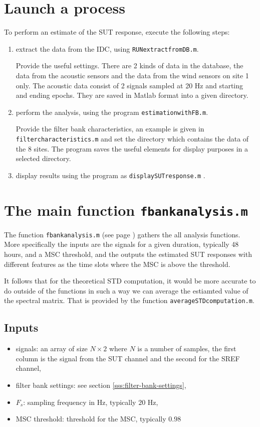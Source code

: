 

\section{Launch a process}
To perform an estimate of the SUT response, execute the following steps:
\begin{enumerate}
\item
extract the data from the IDC, using {\tt RUNextractfromDB.m}. 
 
Provide the useful settings. There are 2 kinds of data in the database, the data from the acoustic sensors and the data from the wind sensors on site 1 only. The acoustic data consist of 2 signals sampled at 20 Hz and starting and ending epochs. They are saved in Matlab format into a given directory. 
\item
perform the analysis, using the program {\tt estimationwithFB.m}.

Provide the filter bank characteristics, an example is given in {\tt filtercharacteristics.m} and set the directory which contains the data of the $8$ sites. The program saves the useful elements for display purposes in a selected directory.
 \item
display results using the program as {\tt displaySUTresponse.m} .

\end{enumerate}


\section{The main function {\tt fbankanalysis.m}}
The function {\tt fbankanalysis.m} (see page \pageref{s:fbankanalysis})  gathers the all analysis functions. More specifically the inputs are the signals for a given duration, typically 48 hours, and a MSC threshold, and the outputs the estimated SUT responses with different features as the time slots where the MSC is above the  threshold.

It follows that for the theoretical STD computation, it would be more accurate to do outside of the functions in such a way we can average the estiamted value of the spectral matrix. That is provided by the function {\tt averageSTDcomputation.m}.

\subsection{Inputs}
\begin{itemize}
\item
signals: an array of size $N\times 2$ where $N$ is a number of samples, the first column is the signal from the SUT channel and the second for the SREF channel,
\item
filter bank settings: see section \ref{sss:filter-bank-settings},
\item
$F_s$: sampling frequency in Hz, typically $20$ Hz,
\item
MSC threshold: threshold for the MSC, typically $0.98$
\end{itemize}

